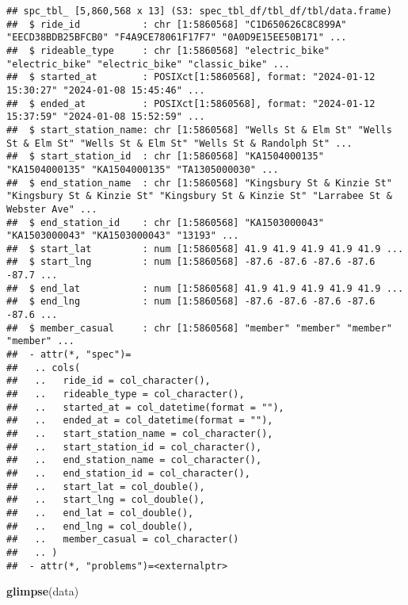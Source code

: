 \documentclass[
]{article}
\newenvironment{Shaded}{\begin{snugshade}}{\end{snugshade}}
\newcommand{\FunctionTok}[1]{\textcolor[rgb]{0.13,0.29,0.53}{\textbf{#1}}}
\newcommand{\NormalTok}[1]{#1}
\begin{document}
\begin{verbatim}
## spc_tbl_ [5,860,568 x 13] (S3: spec_tbl_df/tbl_df/tbl/data.frame)
##  $ ride_id           : chr [1:5860568] "C1D650626C8C899A" "EECD38BDB25BFCB0" "F4A9CE78061F17F7" "0A0D9E15EE50B171" ...
##  $ rideable_type     : chr [1:5860568] "electric_bike" "electric_bike" "electric_bike" "classic_bike" ...
##  $ started_at        : POSIXct[1:5860568], format: "2024-01-12 15:30:27" "2024-01-08 15:45:46" ...
##  $ ended_at          : POSIXct[1:5860568], format: "2024-01-12 15:37:59" "2024-01-08 15:52:59" ...
##  $ start_station_name: chr [1:5860568] "Wells St & Elm St" "Wells St & Elm St" "Wells St & Elm St" "Wells St & Randolph St" ...
##  $ start_station_id  : chr [1:5860568] "KA1504000135" "KA1504000135" "KA1504000135" "TA1305000030" ...
##  $ end_station_name  : chr [1:5860568] "Kingsbury St & Kinzie St" "Kingsbury St & Kinzie St" "Kingsbury St & Kinzie St" "Larrabee St & Webster Ave" ...
##  $ end_station_id    : chr [1:5860568] "KA1503000043" "KA1503000043" "KA1503000043" "13193" ...
##  $ start_lat         : num [1:5860568] 41.9 41.9 41.9 41.9 41.9 ...
##  $ start_lng         : num [1:5860568] -87.6 -87.6 -87.6 -87.6 -87.7 ...
##  $ end_lat           : num [1:5860568] 41.9 41.9 41.9 41.9 41.9 ...
##  $ end_lng           : num [1:5860568] -87.6 -87.6 -87.6 -87.6 -87.6 ...
##  $ member_casual     : chr [1:5860568] "member" "member" "member" "member" ...
##  - attr(*, "spec")=
##   .. cols(
##   ..   ride_id = col_character(),
##   ..   rideable_type = col_character(),
##   ..   started_at = col_datetime(format = ""),
##   ..   ended_at = col_datetime(format = ""),
##   ..   start_station_name = col_character(),
##   ..   start_station_id = col_character(),
##   ..   end_station_name = col_character(),
##   ..   end_station_id = col_character(),
##   ..   start_lat = col_double(),
##   ..   start_lng = col_double(),
##   ..   end_lat = col_double(),
##   ..   end_lng = col_double(),
##   ..   member_casual = col_character()
##   .. )
##  - attr(*, "problems")=<externalptr>
\end{verbatim}

\begin{Shaded}
\begin{Highlighting}[]
\FunctionTok{glimpse}\NormalTok{(data)}
\end{Highlighting}
\end{Shaded}
\end{document}
